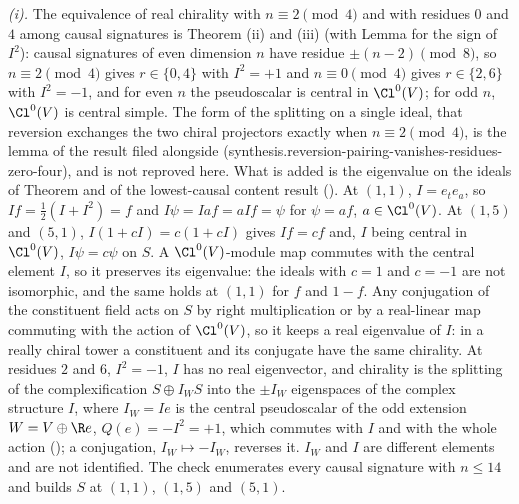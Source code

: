 \emph{(i).} The equivalence of real chirality with $n \equiv 2 \pmod 4$ and with residues $0$ and $4$ among causal signatures is Theorem (ii) and (iii) (with Lemma  for the sign of $I^{2}$): causal signatures of even dimension $n$ have residue $\pm(n-2) \pmod 8$, so $n \equiv 2 \pmod 4$ gives $r \in \{0, 4\}$ with $I^{2} = +1$ and $n \equiv 0 \pmod 4$ gives $r \in \{2, 6\}$ with $I^{2} = -1$, and for even $n$ the pseudoscalar is central in $\Cl^{0}(V)$; for odd $n$, $\Cl^{0}(V)$ is central simple. The form of the splitting on a single ideal, that reversion exchanges the two chiral projectors exactly when $n \equiv 2 \pmod 4$, is the lemma of the result filed alongside (synthesis.reversion-pairing-vanishes-residues-zero-four), and is not reproved here. What is added is the eigenvalue on the ideals of Theorem  and of the lowest-causal content result (). At $(1,1)$, $I = e_{t}e_{a}$, so $If = \tfrac12(I + I^{2}) = f$ and $I\psi = Iaf = aIf = \psi$ for $\psi = af$, $a \in \Cl^{0}(V)$. At $(1,5)$ and $(5,1)$, $I(1 + cI) = c(1 + cI)$ gives $If = cf$ and, $I$ being central in $\Cl^{0}(V)$, $I\psi = c\psi$ on $S$. A $\Cl^{0}(V)$-module map commutes with the central element $I$, so it preserves its eigenvalue: the ideals with $c = 1$ and $c = -1$ are not isomorphic, and the same holds at $(1,1)$ for $f$ and $1 - f$. Any conjugation of the constituent field acts on $S$ by right multiplication or by a real-linear map commuting with the action of $\Cl^{0}(V)$, so it keeps a real eigenvalue of $I$: in a really chiral tower a constituent and its conjugate have the same chirality. At residues $2$ and $6$, $I^{2} = -1$, $I$ has no real eigenvector, and chirality is the splitting of the complexification $S \oplus I_{W}S$ into the $\pm I_{W}$ eigenspaces of the complex structure $I$, where $I_{W} = Ie$ is the central pseudoscalar of the odd extension $W = V \oplus \R e$, $Q(e) = -I^{2} = +1$, which commutes with $I$ and with the whole action (); a conjugation, $I_{W} \mapsto -I_{W}$, reverses it. $I_{W}$ and $I$ are different elements and are not identified. The check enumerates every causal signature with $n \le 14$ and builds $S$ at $(1,1)$, $(1,5)$ and $(5,1)$.

